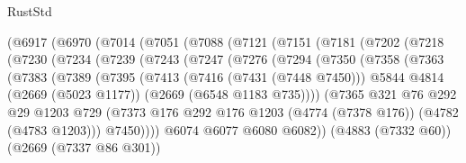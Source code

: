 \begin{lexlean}{RustStd}
\begin{coremodule}
          (@6917
            (@6970
              (@7014
                (@7051
                  (@7088
                    (@7121
                      (@7151
                        (@7181
                          (@7202
                            (@7218
                              (@7230
                                (@7234
                                  (@7239
                                    (@7243
                                      (@7247
                                        (@7276
                                          (@7294
                                            (@7350
                                              (@7358
                                                (@7363
                                                  (@7383
                                                    (@7389
                                                      (@7395
                                                        (@7413
                                                          (@7416 (@7431 (@7448 @7450)))
                                                          @5844
                                                          @4814
                                                          (@2669 (@5023 @1177))
                                                          (@2669 (@6548 @1183 @735))))
                                                      (@7365
                                                        @321
                                                        @76
                                                        @292
                                                        @29
                                                        @1203
                                                        @729
                                                        (@7373
                                                          @176
                                                          @292
                                                          @176
                                                          @1203
                                                          (@4774 (@7378 @176))
                                                          (@4782 (@4783 @1203)))
                                                        @7450))))
                                                @6074
                                                @6077
                                                @6080
                                                @6082))
                                            (@4883 (@7332 @60))
                                            (@2669 (@7337 @86 @301))

\end{coremodule}
\end{lexlean}
